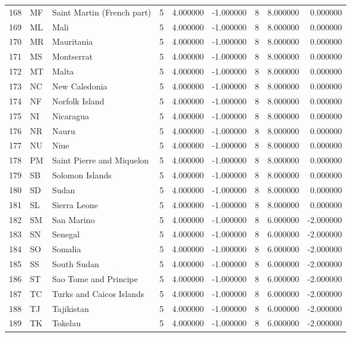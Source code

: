 \begin{tabular}{lllrrrrrr}
168 & MF & Saint Martin (French part) & 5 & 4.000000 & -1.000000 & 8 & 8.000000 & 0.000000 \\
169 & ML & Mali & 5 & 4.000000 & -1.000000 & 8 & 8.000000 & 0.000000 \\
170 & MR & Mauritania & 5 & 4.000000 & -1.000000 & 8 & 8.000000 & 0.000000 \\
171 & MS & Montserrat & 5 & 4.000000 & -1.000000 & 8 & 8.000000 & 0.000000 \\
172 & MT & Malta & 5 & 4.000000 & -1.000000 & 8 & 8.000000 & 0.000000 \\
173 & NC & New Caledonia & 5 & 4.000000 & -1.000000 & 8 & 8.000000 & 0.000000 \\
174 & NF & Norfolk Island & 5 & 4.000000 & -1.000000 & 8 & 8.000000 & 0.000000 \\
175 & NI & Nicaragua & 5 & 4.000000 & -1.000000 & 8 & 8.000000 & 0.000000 \\
176 & NR & Nauru & 5 & 4.000000 & -1.000000 & 8 & 8.000000 & 0.000000 \\
177 & NU & Niue & 5 & 4.000000 & -1.000000 & 8 & 8.000000 & 0.000000 \\
178 & PM & Saint Pierre and Miquelon & 5 & 4.000000 & -1.000000 & 8 & 8.000000 & 0.000000 \\
179 & SB & Solomon Islands & 5 & 4.000000 & -1.000000 & 8 & 8.000000 & 0.000000 \\
180 & SD & Sudan & 5 & 4.000000 & -1.000000 & 8 & 8.000000 & 0.000000 \\
181 & SL & Sierra Leone & 5 & 4.000000 & -1.000000 & 8 & 8.000000 & 0.000000 \\
182 & SM & San Marino & 5 & 4.000000 & -1.000000 & 8 & 6.000000 & -2.000000 \\
183 & SN & Senegal & 5 & 4.000000 & -1.000000 & 8 & 6.000000 & -2.000000 \\
184 & SO & Somalia & 5 & 4.000000 & -1.000000 & 8 & 6.000000 & -2.000000 \\
185 & SS & South Sudan & 5 & 4.000000 & -1.000000 & 8 & 6.000000 & -2.000000 \\
186 & ST & Sao Tome and Principe & 5 & 4.000000 & -1.000000 & 8 & 6.000000 & -2.000000 \\
187 & TC & Turks and Caicos Islands & 5 & 4.000000 & -1.000000 & 8 & 6.000000 & -2.000000 \\
188 & TJ & Tajikistan & 5 & 4.000000 & -1.000000 & 8 & 6.000000 & -2.000000 \\
189 & TK & Tokelau & 5 & 4.000000 & -1.000000 & 8 & 6.000000 & -2.000000 \\

\end{tabular}
